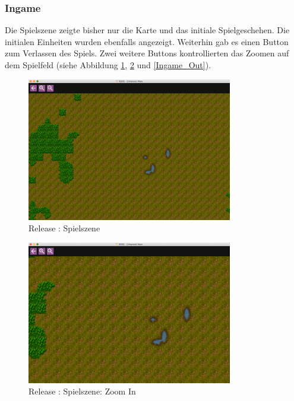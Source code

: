 \documentclass[12pt, titlepage]{scrartcl}
\newcommand{\RN}[1]{%
	\textup{\uppercase\expandafter{\romannumeral#1}}%
}
\begin{document}
	        \subsubsection{Ingame}
	            Die Spielszene zeigte bisher nur die Karte und das initiale Spielgeschehen. Die initialen Einheiten wurden ebenfalls angezeigt. Weiterhin gab es einen Button zum Verlassen des Spiels. Zwei weitere Buttons kontrollierten das Zoomen auf dem Spielfeld (siehe Abbildung \ref{Ingame}, \ref{Ingame_In} und \ref{Ingame_Out}). \\
	            \begin{figure}[H] 
    				\centering
    				\includegraphics[width=0.8\textwidth]{images/old_state/ingame/Ingame.png}
    				\caption{Release \RN{2}: Spielszene}
    				\label{Ingame}
			    \end{figure}
			    \begin{figure}[H] 
    				\centering
    				\includegraphics[width=0.8\textwidth]{images/old_state/ingame/ZoomIn.png}
    				\caption{Release \RN{2}: Spielszene: Zoom In}
    				\label{Ingame_In}
			    \end{figure}
\end{document}
